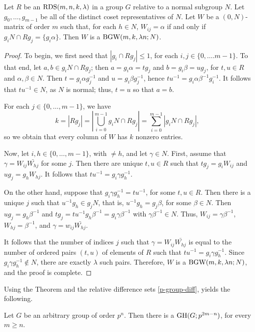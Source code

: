 \documentclass[../../../main]{subfiles}
\begin{document}
 \begin{thm}\label{rel-diff-bgw}
  Let $R$ be an $\text{RDS}(m,n,k,\lambda)$ in a group $G$ relative to a normal subgroup $N$. Let $g_0, \dots, g_{m-1}$ be all of the distinct coset representatives of $N$. Let $W$ be a $(0,N)$-matrix of order $m$ such that, for each $h \in N$, $W_{ij}=\alpha$ if and only if $g_iN \cap Rg_j = \{g_i\alpha\}$. Then $W$ is a $\text{BGW}(m,k,\lambda n; N)$.
 \end{thm}
 
 \begin{proof}
  To begin, we first need that $|g_i \cap Rg_j| \leq 1$, for each $i,j \in \{0,\dots.m-1\}$. To that end, let $a,b \in g_iN \cap Rg_j$; then $a=g_i\alpha=tg_j$ and $b=g_i\beta=ug_j$, for $t,u \in R$ and $\alpha,\beta \in N$. Then $t=g_i\alpha g_j^{-1}$ and $u=g_i\beta g_j^{-1}$, hence $tu^{-1} = g_i\alpha\beta^{-1} g_i^{-1}$. It follows that $tu^{-1} \in N$, as $N$ is normal; thus, $t=u$ so that $a=b$. 
  
  For each $j \in \{0,\dots,m-1\}$, we have
  \[
   k=|Rg_j|=\left|\bigcup_{i=0}^{m-1} g_iN \cap Rg_j\right|=\sum_{i=0}^{m-1} |g_iN \cap Rg_j|,
  \]
  so we obtain that every column of $W$ has $k$ nonzero entries.
  
  Now, let $i,h \in \{0,\dots,m-1\}$, with $ \neq h$, and let $\gamma \in N$. First, assume that $\gamma=W_{ij}\bar{W_{hj}}$ for some $j$. Then there are unique $t,u \in R$ such that $tg_j=g_iW_{ij}$ and $ug_j=g_hW_{hj}$. It follows that $tu^{-1}=g_i\gamma g_h^{-1}$.
  
  On the other hand, suppose that $g_i\gamma g_h^{-1}=tu^{-1}$, for some $t,u \in R$. Then there is a unique $j$ such that $u^{-1}g_h \in g_jN$, that is, $u^{-1}g_h=g_j\beta$, for some $\beta \in N$. Then $ug_j=g_h\beta^{-1}$ and $tg_j=tu^{-1}g_h\beta^{-1}=g_i\gamma\beta^{-1}$ with $\gamma\beta^{-1} \in N$. Thus, $W_{ij}=\gamma\beta^{-1}$, $W_{hj}=\beta^{-1}$, and $\gamma=w_{ij}\bar{W_{hj}}$.
  
  It follows that the number of indices $j$ such that $\gamma=W_{ij}\bar{W_{hj}}$ is equal to the number of ordered pairs $(t,u)$ of elements of $R$ such that $tu^{-1}=g_i\gamma g_h^{-1}$. Since $g_i\gamma g_h^{-1} \not\in N$, there are exactly $\lambda$ such pairs. Therefore, $W$ is a $\text{BGW}(m,k,\lambda n;N)$, and the proof is complete.
 \end{proof}
 
 Using the Theorem and the relative difference sets \ref{p-group-diff}, yields the following.
 
 \begin{cor}
  Let $G$ be an arbitrary group of order $p^n$. Then there is a $\text{GH}(G;p^{2m-n})$, for every $m \geq n$.
 \end{cor}
 
\end{document}
